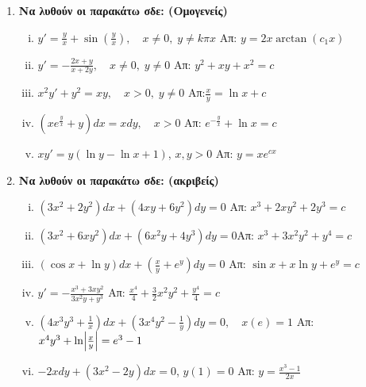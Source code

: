 \begin{enumerate}
  \item {\bfseries Να λυθούν οι παρακάτω σδε: (Ομογενείς)}
    \begin{enumerate}[i)]
      \item $y'=\frac{y}{x}+\sin(\frac{y}{x}), \quad x\neq 0,\; y\neq k\pi x$ 
        \hfill Απ: $y=2x\arctan(c_{1}x)$
      \item $y'=-\frac{2x+y}{x+2y}, \quad x\neq 0,\; y\neq 0$  
        \hfill Απ: $y^{2}+xy+x^{2}=c$
      \item $x^{2}y'+y^{2}=xy, \quad x>0,\; y\neq 0$ \hfill Απ:$\frac{x}{y}=\ln x+c$
      \item $\left(xe^{\frac{y}{x}}+y\right)dx=xdy, \quad x>0$ 
        \hfill Απ: $e^{-\frac{y}{x}}+\ln x =c$
      \item $ xy'=y(\ln{y} - \ln{x} +1) $, $ x,y>0 $ \hfill Απ: $ y=xe^{cx} $ 
    \end{enumerate}

  \item {\bfseries Να λυθούν οι παρακάτω σδε: (ακριβείς)}
    \begin{enumerate}[i)]
      \item $ (3x^{2}+2y^{2})dx+(4xy+6y^{2})dy=0  $ 
        \hfill Απ: $ x^{3}+2xy^{2}+2y^{3}=c $ 
      \item $(3x^2+6xy^2)dx+(6x^2y+4y^3)dy=0$\hfill Απ: $x^3+3x^2y^2+y^4=c$
      \item $ (\cos{x} + \ln{y})dx + \left(\frac{x}{y} + e^{y}\right)dy=0 $ 
        \hfill Απ: $ \sin{x} + x \ln{y} + e^{y}=c $ 
      \item $ y'=- \frac{x^{3}+3xy^{2}}{3x^{2}y+y^{3}} $ 
        \hfill Απ: $ \frac{x^{4}}{4}+\frac{3}{2} x^{2}y^{2}+\frac{y^{4}}{4} = c $ 
      \item $\left(4x^3y^3+\frac{1}{x}\right)dx+\left(3x^4y^2-
        \frac{1}{y}\right)dy=0, \quad x(e)=1$
        \hfill Απ: $x^4y^3+\ln \Bigl|\frac{x}{y}\Bigr|=e^3-1$
      \item $ -2xdy + (3x^{2}-2y)dx=0 $, \quad $ y(1)=0 $ 
        \hfill Απ: $ y= \frac{x^{3}-1}{2x} $ 
    \end{enumerate}

\end{enumerate}


